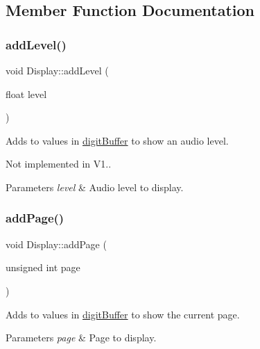 \subsection{Member Function Documentation}
\mbox{\label{classdrumpi_1_1Display_aed0dfcb7bbf5209a9a1501e2d63fe947}} 
\subsubsection{\texorpdfstring{add\+Level()}{addLevel()}}
{\footnotesize\ttfamily void Display\+::add\+Level (\begin{DoxyParamCaption}\item[{float}]{level }\end{DoxyParamCaption})\hspace{0.3cm}{\ttfamily [private]}}

Adds to values in \hyperlink{classdrumpi_1_1Max7219_ab26f32728dd82c00e39b6212436f291e}{digit\+Buffer} to show an audio level.

Not implemented in V1.. 
\begin{DoxyParams}{Parameters}
{\em level} & Audio level to display. \\
\hline
\end{DoxyParams}
\mbox{\label{classdrumpi_1_1Display_a8ff778f88ca14acb0232b0afec54b972}} 
\subsubsection{\texorpdfstring{add\+Page()}{addPage()}}
{\footnotesize\ttfamily void Display\+::add\+Page (\begin{DoxyParamCaption}\item[{unsigned int}]{page }\end{DoxyParamCaption})\hspace{0.3cm}{\ttfamily [private]}}

Adds to values in \hyperlink{classdrumpi_1_1Max7219_ab26f32728dd82c00e39b6212436f291e}{digit\+Buffer} to show the current page.


\begin{DoxyParams}{Parameters}
{\em page} & Page to display. \\
\hline
\end{DoxyParams}
\mbox{\label{classdrumpi_1_1Display_a98f1e8a6fe644f75dc086cf23c5687c6}} 
